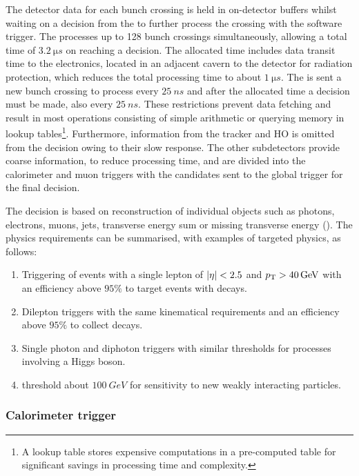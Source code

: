 The detector data for each bunch crossing is held in on-detector buffers
whilst waiting on a decision from the \HWT to further process the crossing
with the software trigger. The \HWT processes up to 128 bunch crossings
simultaneously, allowing a total time of ${\SI{3.2}{\micro s}}$ on reaching a
decision. The allocated time includes data transit time to the electronics,
located in an adjacent cavern to the detector for radiation protection, which
reduces the total processing time to about ${\SI{1}{\micro s}}$. The \HWT is
sent a new bunch crossing to process every ${\SI{25}{ns}}$ and after the
allocated time a decision must be made, also every ${\SI{25}{ns}}$. These
restrictions prevent data fetching and result in most operations consisting of
simple arithmetic or querying memory in lookup tables\footnote{A lookup table
stores expensive computations in a pre-computed table for significant savings
in processing time and complexity.}. Furthermore, information from the tracker
and HO is omitted from the \HWT decision owing to their slow response. The
other subdetectors provide coarse information, to reduce processing time, and
are divided into the calorimeter and muon triggers with the candidates sent to
the global trigger for the final decision.

The \HWT decision is based on reconstruction of individual objects such as
photons, electrons, muons, jets, transverse energy sum or missing transverse
energy (\etmiss). The physics requirements can be summarised, with examples of
targeted physics, as follows:

\begin{enumerate}
    \item Triggering of events with a single lepton of ${|\eta|<2.5}$ and
    ${p_{\text{T}}>\SI{40}{GeV}}$ with an efficiency above $95\%$ to target events with
    \PW decays.
    \item Dilepton triggers with the same kinematical requirements and an
    efficiency above $95\%$ to collect \PZ decays.
    \item Single photon and diphoton triggers with similar thresholds for
    processes involving a Higgs boson.
    \item \etmiss threshold about ${\SI{100}{GeV}}$ for sensitivity to new
    weakly interacting particles.
\end{enumerate}


\subsubsection{Calorimeter trigger}

